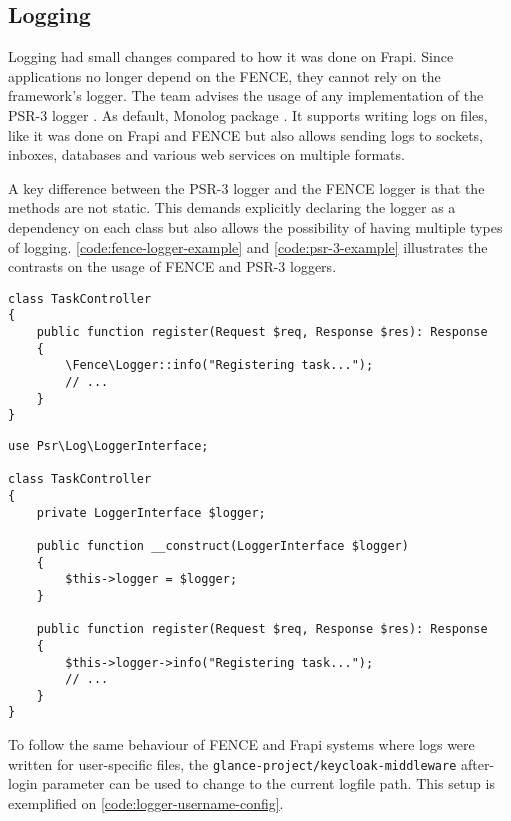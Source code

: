 \subsection{Logging}

Logging had small changes compared to how it was done on Frapi. Since applications no longer depend on the FENCE, they cannot rely on the framework's logger. The team advises the usage of any implementation of the PSR-3 logger \cite{psr-3}. As default, Monolog package \cite{monolog}. It supports writing logs on files, like it was done on Frapi and FENCE but also allows sending logs to sockets, inboxes, databases and various web services on multiple formats.

A key difference between the PSR-3 logger and the FENCE logger is that the methods are not static. This demands explicitly declaring the logger as a dependency on each class but also allows the possibility of having multiple types of logging. \autoref{code:fence-logger-example} and \autoref{code:psr-3-example} illustrates the contrasts on the usage of FENCE and PSR-3 loggers.

\begin{listing}[htbp]
\begin{verbatim}
class TaskController
{
	public function register(Request $req, Response $res): Response
	{
		\Fence\Logger::info("Registering task...");
		// ...
	}
}
\end{verbatim}
\caption{Usage example of the FENCE logger.}
\label{code:fence-logger-example}
\end{listing}

\begin{listing}[htbp]
\begin{verbatim}
use Psr\Log\LoggerInterface;

class TaskController
{
	private LoggerInterface $logger;

	public function __construct(LoggerInterface $logger)
	{
		$this->logger = $logger;
	}

	public function register(Request $req, Response $res): Response
	{
		$this->logger->info("Registering task...");
		// ...
	}
}
\end{verbatim}
\caption{Usage example of the PSR-3 logger.}
\label{code:psr-3-example}
\end{listing}

To follow the same behaviour of FENCE and Frapi systems where logs were written for user-specific files, the \texttt{glance-project/keycloak-middleware} after-login parameter can be used to change to the current logfile path. This setup is exemplified on \autoref{code:logger-username-config}.

